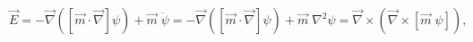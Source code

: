 \begin{equation}
\vec E = - \vec\nabla\left([\vec m\cdot\vec\nabla] \psi\right) 
+ \vec m \; \ddot \psi
=  - \vec\nabla\left([\vec m\cdot\vec\nabla] \psi\right)
+ \vec m \; \nabla^2 \psi
= \vec\nabla\times(\vec\nabla\times[\vec m\; \psi]),
\end{equation}


